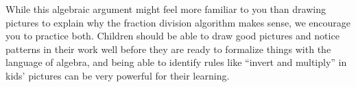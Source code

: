 \documentclass{ximera}
\begin{document}
While this algebraic argument might feel more familiar to you than drawing pictures to explain why the fraction division algorithm makes sense, we encourage you to practice both. Children should be able to draw good pictures and notice patterns in their work well before they are ready to formalize things with the language of algebra, and being able to identify rules like ``invert and multiply'' in kids' pictures can be very powerful for their learning.
\end{document}
